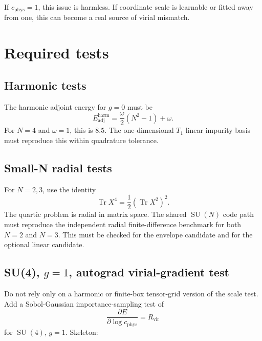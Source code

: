\documentclass[11pt]{article}
\newcommand{\Tr}{\operatorname{Tr}}
\newcommand{\Rvir}{R_{\mathrm{vir}}}
\newcommand{\SU}{\operatorname{SU}}
\begin{document}
If \(c_{\mathrm{phys}}=1\), this issue is harmless. If coordinate scale is learnable or fitted away from one, this can become a real source of virial mismatch.

\section{Required tests}

\subsection{Harmonic tests}

The harmonic adjoint energy for \(g=0\) must be
\begin{equation}
E_{\mathrm{adj}}^{\mathrm{harm}}=\frac{\omega}{2}(N^2-1)+\omega.
\end{equation}
For \(N=4\) and \(\omega=1\), this is \(8.5\). The one-dimensional \(T_1\) linear impurity basis must reproduce this within quadrature tolerance.

\subsection{Small-N radial tests}

For \(N=2,3\), use the identity
\begin{equation}
\Tr X^4=\frac12(\Tr X^2)^2.
\end{equation}
The quartic problem is radial in matrix space. The shared \(\SU(N)\) code path must reproduce the independent radial finite-difference benchmark for both \(N=2\) and \(N=3\). This must be checked for the envelope candidate and for the optional linear candidate.

\subsection{SU(4), \(g=1\), autograd virial-gradient test}

Do not rely only on a harmonic or finite-box tensor-grid version of the scale test. Add a Sobol-Gaussian importance-sampling test of
\begin{equation}
\frac{\partial E}{\partial\log c_{\mathrm{phys}}}=\Rvir
\end{equation}
for \(\SU(4)\), \(g=1\). Skeleton:
\end{document}
